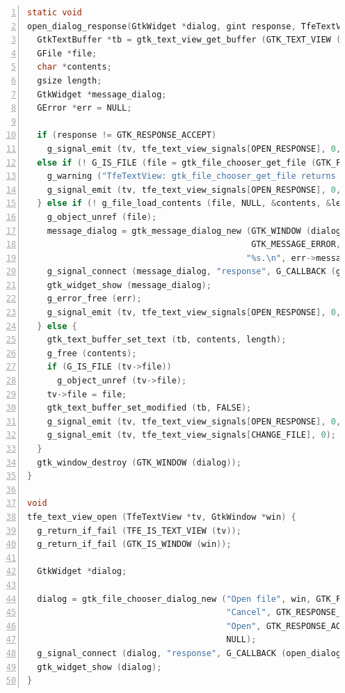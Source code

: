 \begin{lstlisting}[language=C, numbers=left]
static void
open_dialog_response(GtkWidget *dialog, gint response, TfeTextView *tv) {
  GtkTextBuffer *tb = gtk_text_view_get_buffer (GTK_TEXT_VIEW (tv));
  GFile *file;
  char *contents;
  gsize length;
  GtkWidget *message_dialog;
  GError *err = NULL;

  if (response != GTK_RESPONSE_ACCEPT)
    g_signal_emit (tv, tfe_text_view_signals[OPEN_RESPONSE], 0, TFE_OPEN_RESPONSE_CANCEL);
  else if (! G_IS_FILE (file = gtk_file_chooser_get_file (GTK_FILE_CHOOSER (dialog)))) {
    g_warning ("TfeTextView: gtk_file_chooser_get_file returns non GFile.\n");
    g_signal_emit (tv, tfe_text_view_signals[OPEN_RESPONSE], 0, TFE_OPEN_RESPONSE_ERROR);
  } else if (! g_file_load_contents (file, NULL, &contents, &length, NULL, &err)) { /* read error */
    g_object_unref (file);
    message_dialog = gtk_message_dialog_new (GTK_WINDOW (dialog), GTK_DIALOG_MODAL,
                                             GTK_MESSAGE_ERROR, GTK_BUTTONS_CLOSE,
                                            "%s.\n", err->message);
    g_signal_connect (message_dialog, "response", G_CALLBACK (gtk_window_destroy), NULL);
    gtk_widget_show (message_dialog);
    g_error_free (err);
    g_signal_emit (tv, tfe_text_view_signals[OPEN_RESPONSE], 0, TFE_OPEN_RESPONSE_ERROR);
  } else {
    gtk_text_buffer_set_text (tb, contents, length);
    g_free (contents);
    if (G_IS_FILE (tv->file))
      g_object_unref (tv->file);
    tv->file = file;
    gtk_text_buffer_set_modified (tb, FALSE);
    g_signal_emit (tv, tfe_text_view_signals[OPEN_RESPONSE], 0, TFE_OPEN_RESPONSE_SUCCESS);
    g_signal_emit (tv, tfe_text_view_signals[CHANGE_FILE], 0);
  }
  gtk_window_destroy (GTK_WINDOW (dialog));
}

void
tfe_text_view_open (TfeTextView *tv, GtkWindow *win) {
  g_return_if_fail (TFE_IS_TEXT_VIEW (tv));
  g_return_if_fail (GTK_IS_WINDOW (win));

  GtkWidget *dialog;

  dialog = gtk_file_chooser_dialog_new ("Open file", win, GTK_FILE_CHOOSER_ACTION_OPEN,
                                        "Cancel", GTK_RESPONSE_CANCEL,
                                        "Open", GTK_RESPONSE_ACCEPT,
                                        NULL);
  g_signal_connect (dialog, "response", G_CALLBACK (open_dialog_response), tv);
  gtk_widget_show (dialog);
}
\end{lstlisting}

